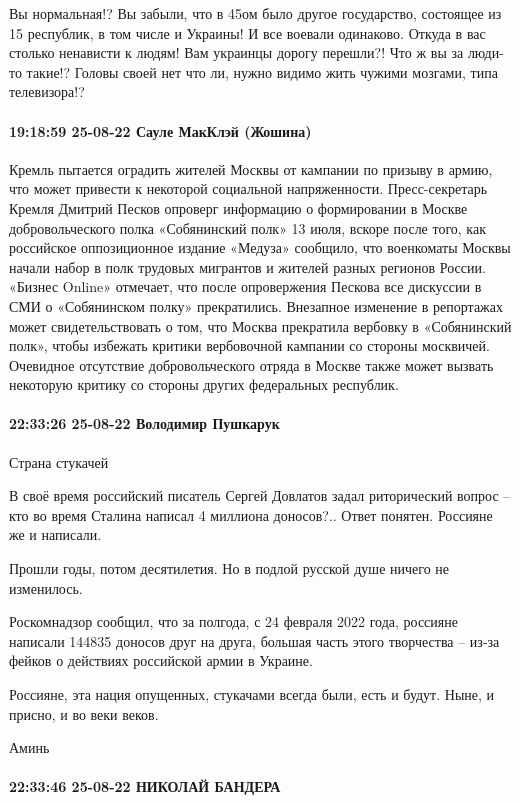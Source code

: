 Вы нормальная!? Вы забыли, что в 45ом было другое государство, состоящее из 15
республик, в том числе и Украины! И все воевали одинаково. Откуда в вас столько
ненависти к людям! Вам украинцы дорогу перешли?! Что ж вы за люди-то такие!?
Головы своей нет что ли, нужно видимо жить чужими мозгами, типа телевизора!?


\paragraph{19:18:59 25-08-22 Сауле МакКлэй (Жошина)}

Кремль пытается оградить жителей Москвы от кампании по призыву в армию, что
может привести к некоторой социальной напряженности. Пресс-секретарь Кремля
Дмитрий Песков опроверг информацию о формировании в Москве добровольческого
полка «Собянинский полк» 13 июля, вскоре после того, как российское
оппозиционное издание «Медуза» сообщило, что военкоматы Москвы начали набор в
полк трудовых мигрантов и жителей разных регионов России. «Бизнес Online»
отмечает, что после опровержения Пескова все дискуссии в СМИ о «Собянинском
полку» прекратились. Внезапное изменение в репортажах может свидетельствовать о
том, что Москва прекратила вербовку в «Собянинский полк», чтобы избежать
критики вербовочной кампании со стороны москвичей. Очевидное отсутствие
добровольческого отряда в Москве также может вызвать некоторую критику со
стороны других федеральных республик.

\paragraph{22:33:26 25-08-22 Володимир Пушкарук}

Страна стукачей

В своё время российский писатель Сергей Довлатов задал
риторический вопрос – кто во время Сталина написал 4 миллиона доносов?.. Ответ
понятен. Россияне же и написали.

Прошли годы, потом десятилетия. Но в подлой русской душе
ничего не изменилось.

Роскомнадзор сообщил, что за полгода, с 24 февраля 2022
года, россияне написали 144835 доносов друг на друга, большая часть этого
творчества – из-за фейков о действиях российской армии в Украине.

Россияне, эта нация опущенных, стукачами всегда были, есть и
будут. Ныне, и присно, и во веки веков.

Аминь

\paragraph{22:33:46 25-08-22 НИКОЛАЙ БАНДЕРА}

